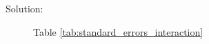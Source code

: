 \documentclass[11pt, letterpaper]{article}
\begin{document}
\begin{enumerate}[(a)]


\begin{description}
\item[Solution:] Table \ref{tab:standard_errors_interaction}
\end{description}

\end{enumerate}
\end{document}
